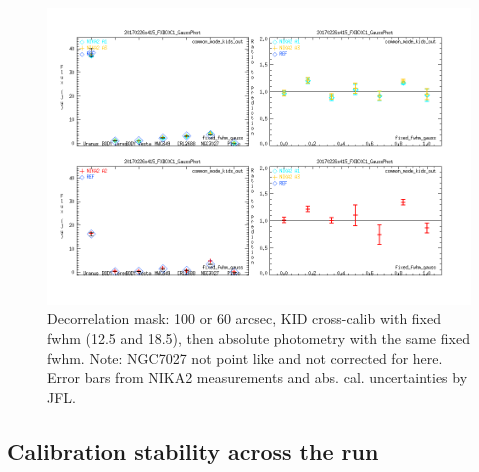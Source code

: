 \documentclass[a4paper, 11pt]{article} %
\begin{document}
\begin{figure}
\begin{center}
\includegraphics[clip, angle=0, scale = 0.4]{Figures/Calibrators_N2R9_20170226s415_FXDC0C1_GaussPhotFluxType_fixed_fwhm_gauss.png}
\caption{Decorrelation mask: 100 or 60 arcsec, KID cross-calib with fixed fwhm
  (12.5 and 18.5), then absolute photometry with the same fixed fwhm. Note:
  NGC7027 not point like and not corrected for here. Error bars from NIKA2
  measurements and abs. cal. uncertainties by JFL.}
\label{fig:fov}
\end{center}
\end{figure}


\subsection{Calibration stability across the run}
\end{document}
